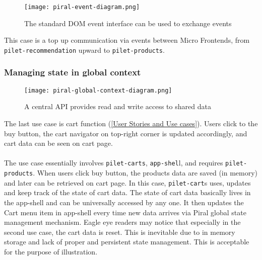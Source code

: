 \documentclass[a4paper]{book}
\begin{document}
\begin{figure}[h!]
  \centering
  \captionsetup{justification=centering}
  \texttt{[image: piral-event-diagram.png]}
  \caption{The standard DOM event interface can be used to exchange events \cite{Rap20}}
  \label{fig:piral-event-diagram}
\end{figure}

This case is a top up communication via events between Micro Frontends, from \verb|pilet-recommendation| upward to \verb|pilet-products|.  

\subsubsection{Managing state in global context}

\begin{figure}[h!]
  \centering
  \captionsetup{justification=centering}
  \texttt{[image: piral-global-context-diagram.png]}
  \caption{A central API provides read and write access to shared data \cite{Rap20}}
  \label{fig:piral-global-context-diagram}
\end{figure}

The last use case is cart function (\ref{User Stories and Use cases}). Users click to the buy button, the cart navigator on top-right corner is updated accordingly, and cart data can be seen on cart page.
\\ \\ 
The use case essentially involves \verb|pilet-carts|, \verb|app-shel|l, and requires \verb|pilet-products|. When users click buy button, the products data are saved (in memory) and later can be retrieved on cart page. In this case, \verb|pilet-cart|s uses, updates and keep track of the state of cart data. The state of cart data basically lives in the app-shell and can be universally accessed by any one. It then updates the Cart menu item in app-shell every time new data arrives via Piral global state management mechanism. Eagle eye readers may notice that especially in the second use case, the cart data is reset. This is inevitable due to in memory storage and lack of proper and persistent state management. This is acceptable for the purpose of illustration.
\end{document}
